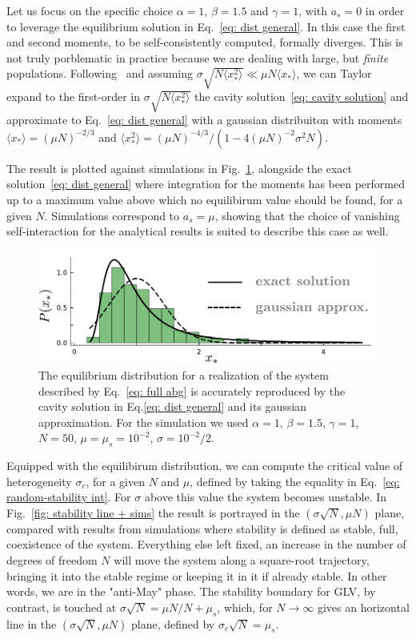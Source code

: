 \documentclass[
 reprint,
 amsmath,amssymb,
 aps,
]{revtex4-2}
\begin{document}
Let us focus on the specific choice 
$\alpha=1$, $\beta=1.5$ and $\gamma=1$, with
$a_s=0$ in order to leverage the equilibrium solution in Eq.~\eqref{eq: dist general}.
In this case the first and second moments, 
to be self-consistently computed, formally diverges. This is not truly porblematic in practice
because we are dealing with large, but \emph{finite} populations.
Following~\cite{Cui2020,Hatton2023} and assuming
$\sigma \sqrt{N\langle x_*^2\rangle}\ll \mu N \langle x_* \rangle$,
we can Taylor expand to the first-order in 
$\sigma \sqrt{N\langle x_*^2\rangle}$ the cavity 
solution~\eqref{eq: cavity solution} and 
approximate to Eq.~\eqref{eq: dist general} with
a gaussian distribuiton
with moments $\langle x_*\rangle=(\mu N)^{-2/3}$ and
$\langle x_*^2\rangle=(\mu N)^{-4/3}/(1-4(\mu N)^{-2}\sigma^2N)$.

The result is plotted against simulations in 
Fig.~\ref{fig: cavity sol.}, alongside the exact 
solution~\eqref{eq: dist general} 
where integration for the moments has been performed up to a maximum
value above which no equilibirum value should 
be found, for a given $N$.
Simulations correspond to $a_s=\mu$, showing that the choice
of vanishing self-interaction for the analytical results
is suited to describe this case as well.

\begin{figure}[h!]
    \centering
    \includegraphics[width=.45\textwidth]{figs/cavity.pdf}
    \caption{The equilibrium distribution for a realization
    of the system described by Eq.~\eqref{eq: full abg} 
    is accurately reproduced by the cavity solution in 
    Eq.\eqref{eq: dist general} and its gaussian approximation.
    For the simulation we used  $\alpha=1$, $\beta=1.5$,
    $\gamma=1$, $N=50$, $\mu=\mu_s=10^{-2}$, $\sigma=10^{-2}/2$.}
    \label{fig: cavity sol.}
\end{figure}

Equipped with the equilibirum distribution, we can compute
the critical value of heterogeneity 
$\sigma_c$, for a given $N$ and $\mu$,
defined by taking the equality in 
Eq.~\eqref{eq: random-stability int}. 
For $\sigma$ above this value the system becomes
unstable. In Fig.~\ref{fig: stability line + sims}
the result is portrayed in the $(\sigma \sqrt{N},\mu N)$ plane,
compared with results from simulations where stability is defined
as stable, full, coexistence of the system.
Everything else left fixed, an increase in the number of
degrees of freedom $N$ will move the system along a square-root
trajectory, bringing it into the stable regime or keeping it
in it if already stable. In other words, we are in the
"anti-May" phase. The stability boundary for GLV, by contrast, is touched
at $\sigma \sqrt{N} = \mu N/N + \mu_s$, which, for $N\to \infty$
gives an horizontal line in the $(\sigma \sqrt{N},\mu N)$ plane,
defined by $\sigma_c\sqrt{N} = \mu_s$.
\end{document}
